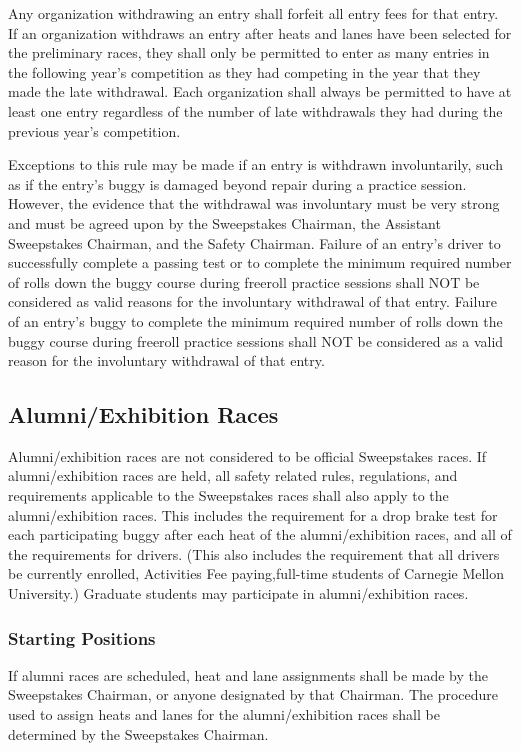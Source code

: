 Any organization withdrawing an entry shall forfeit all entry fees for that entry. If an organization withdraws an entry after heats and lanes have been selected for the preliminary races, they shall only be permitted to enter as many entries in the following year's competition as they had competing in the year that they made the late withdrawal. Each organization shall always be permitted to have at least one entry regardless of the number of late withdrawals they had during the previous year's competition.

Exceptions to this rule may be made if an entry is withdrawn involuntarily, such as if the entry's buggy is damaged beyond repair during a practice session. However, the evidence that the withdrawal was involuntary must be very strong and must be agreed upon by the Sweepstakes Chairman, the Assistant Sweepstakes Chairman, and the Safety Chairman. Failure of an entry's driver to successfully complete a passing test or to complete the minimum required number of rolls down the buggy course during freeroll practice sessions shall NOT be considered as valid reasons for the involuntary withdrawal of that entry. Failure of an entry's buggy to complete the minimum required number of rolls down the buggy course during freeroll practice sessions shall NOT be considered as a valid reason for the involuntary withdrawal of that entry.

\subsection{Alumni/Exhibition Races}

Alumni/exhibition races are not considered to be official Sweepstakes races. If alumni/exhibition races are held, all safety related rules, regulations, and requirements applicable to the Sweepstakes races shall also apply to the alumni/exhibition races. This includes the requirement for a drop brake test for each participating buggy after each heat of the alumni/exhibition races, and all of the requirements for drivers. (This also includes the requirement that all drivers be currently enrolled, Activities Fee paying,full-time students of Carnegie Mellon University.) Graduate students may participate in alumni/exhibition races.

\subsubsection{Starting Positions}

If alumni races are scheduled, heat and lane assignments shall be made by the Sweepstakes Chairman, or anyone designated by that Chairman. The procedure used to assign heats and lanes for the alumni/exhibition races shall be determined by the Sweepstakes Chairman.

